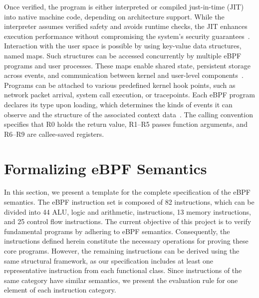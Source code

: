\documentclass[sigconf]{acmart}
\begin{document}
Once verified, the program is either interpreted or compiled just-in-time (JIT) into native machine code, depending on architecture support. While the interpreter assumes verified safety and avoids runtime checks, the JIT enhances execution performance without compromising the system’s security guarantees~\cite{nelson2020specification,yuan2024endIot}.
Interaction with the user space is possible by using key-value data structures, named maps. Such structures can be accessed concurrently by multiple eBPF programs and user processes. These maps enable shared state, persistent storage across events, and communication between kernel and user-level components~\cite{santos2019fast}.
Programs can be attached to various predefined kernel hook points, such as network packet arrival, system call execution, or tracepoints. Each eBPF program declares its type upon loading, which determines the kinds of events it can observe and the structure of the associated context data~\cite{rice2023learning,kernel2024bpfdoc}. The calling convention specifies that R0 holds the return value, R1–R5 passes function arguments, and R6–R9 are callee-saved registers.


\section{Formalizing eBPF Semantics}\label{sec:semantics}

In this section, we present a template for the complete specification of the eBPF semantics. The eBPF instruction set is composed of 82 instructions, which can be divided into 44 ALU, logic and arithmetic, instructions, 13 memory instructions, and 25 control flow instructions. 
The current objective of this project is to verify fundamental programs by adhering to eBPF semantics. Consequently, the instructions defined herein constitute the necessary operations for proving these core programs. However, the remaining instructions can be derived using the same structural framework, as our specification includes at least one representative instruction from each functional class.
Since instructions of the same category have similar semantics, we present the evaluation rule for one element of each instruction category.%
\end{document}
